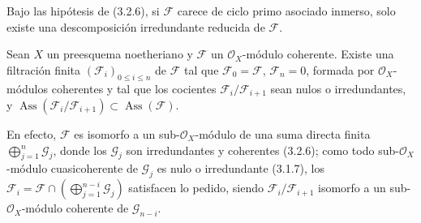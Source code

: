 \begin{corollary}[3.2.7]
\label{IV.2.3.2.7-fr}
Bajo las hipótesis de \textup{(3.2.6)}, si $\mathcal F$ carece de ciclo primo asociado
inmerso, solo existe una descomposición irredundante reducida de $\mathcal F$.
\end{corollary}

\begin{corollary}[3.2.8]
\label{IV.2.3.2.8-fr}
Sean $X$ un preesquema noetheriano y $\mathcal F$ un $\mathcal O_X$-módulo
coherente. Existe una filtración finita $(\mathcal F_i)_{0\le i\le n}$ de
$\mathcal F$ tal que $\mathcal F_0=\mathcal F$, $\mathcal F_n=0$, formada por
$\mathcal O_X$-módulos coherentes y tal que los cocientes
$\mathcal F_i/\mathcal F_{i+1}$ sean nulos o irredundantes, y
$\operatorname{Ass}(\mathcal F_i/\mathcal F_{i+1})
\subset\operatorname{Ass}(\mathcal F)$.
\end{corollary}

En efecto, $\mathcal F$ es isomorfo a un sub-$\mathcal O_X$-módulo de una
suma directa finita $\bigoplus_{j=1}^n\mathcal G_j$, donde los $\mathcal G_j$
son irredundantes y coherentes (3.2.6); como todo
sub-$\mathcal O_X$-módulo cuasicoherente de $\mathcal G_j$ es nulo o
irredundante (3.1.7), los
$\mathcal F_i=\mathcal F\cap(\bigoplus_{j=1}^{n-i}\mathcal G_j)$ satisfacen lo
pedido, siendo $\mathcal F_i/\mathcal F_{i+1}$ isomorfo a un
sub-$\mathcal O_X$-módulo coherente de $\mathcal G_{n-i}$.

